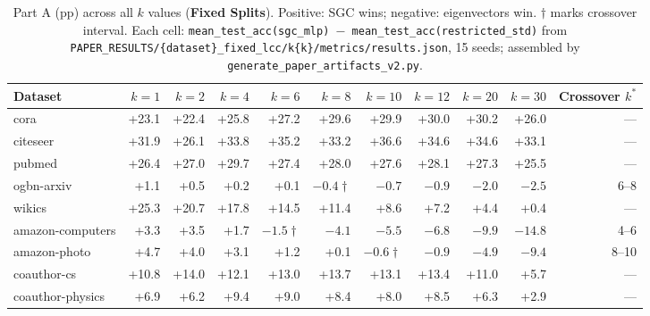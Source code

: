 \documentclass[11pt]{article}
\begin{document}
\begin{table}[H]
\centering\scriptsize\setlength{\tabcolsep}{3pt}
\caption{Part A (pp) across all $k$ values (\textbf{Fixed Splits}). Positive: SGC wins;
negative: eigenvectors win. $\dagger$ marks crossover interval.
Each cell: \texttt{mean\_test\_acc(sgc\_mlp) $-$ mean\_test\_acc(restricted\_std)}
from \texttt{PAPER\_RESULTS/\{dataset\}\_fixed\_lcc/k\{k\}/metrics/results.json},
15 seeds; assembled by \texttt{generate\_paper\_artifacts\_v2.py}.}
\label{tab:part_a_k_sweep_fixed}
\begin{tabular}{lrrrrrrrrrr}
\toprule
Dataset & $k{=}1$ & $k{=}2$ & $k{=}4$ & $k{=}6$ & $k{=}8$ & $k{=}10$ & $k{=}12$ & $k{=}20$ & $k{=}30$ & Crossover $k^*$ \\
\midrule
cora & +23.1 & +22.4 & +25.8 & +27.2 & +29.6 & +29.9 & +30.0 & +30.2 & +26.0 & --- \\
citeseer & +31.9 & +26.1 & +33.8 & +35.2 & +33.2 & +36.6 & +34.6 & +34.6 & +33.1 & --- \\
pubmed & +26.4 & +27.0 & +29.7 & +27.4 & +28.0 & +27.6 & +28.1 & +27.3 & +25.5 & --- \\
ogbn-arxiv & +1.1 & +0.5 & +0.2 & +0.1 & $-0.4\dagger$ & $-0.7$ & $-0.9$ & $-2.0$ & $-2.5$ & 6--8 \\
wikics & +25.3 & +20.7 & +17.8 & +14.5 & +11.4 & +8.6 & +7.2 & +4.4 & +0.4 & --- \\
amazon-computers & +3.3 & +3.5 & +1.7 & $-1.5\dagger$ & $-4.1$ & $-5.5$ & $-6.8$ & $-9.9$ & $-14.8$ & 4--6 \\
amazon-photo & +4.7 & +4.0 & +3.1 & +1.2 & +0.1 & $-0.6\dagger$ & $-0.9$ & $-4.9$ & $-9.4$ & 8--10 \\
coauthor-cs & +10.8 & +14.0 & +12.1 & +13.0 & +13.7 & +13.1 & +13.4 & +11.0 & +5.7 & --- \\
coauthor-physics & +6.9 & +6.2 & +9.4 & +9.0 & +8.4 & +8.0 & +8.5 & +6.3 & +2.9 & --- \\
\bottomrule
\end{tabular}
\end{table}
\end{document}
